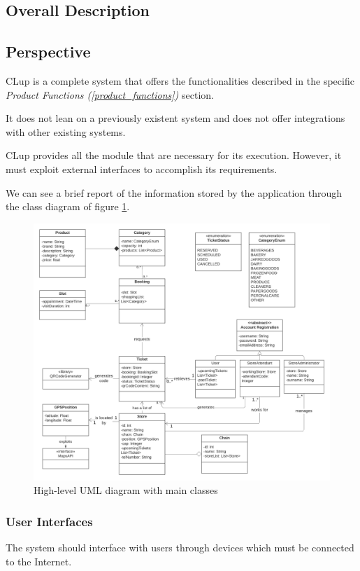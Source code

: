 \documentclass[table, 12pt]{article}
\begin{document}
\begin{flushleft}
    \section{Overall Description}
    \subsection{Perspective}
    CLup is a complete system that offers the functionalities described in the specific \textit{Product Functions (\ref{product_functions})} section.

    It does not lean on a previously existent system and does not offer integrations with other existing systems.

    CLup provides all the module that are necessary for its execution. However, it must exploit external interfaces to accomplish its requirements.

    We can see a brief report of the information stored by the application through the class diagram of figure \ref{class_diagram}.

    \begin{figure}
        \hspace{-50px}
        \includegraphics[scale=0.6]{assets/UML.png}
        \caption{High-level UML diagram with main classes}
        \label{class_diagram}

    \end{figure}

    \subsubsection{User Interfaces}
    The system should interface with users through devices which must be connected to the Internet.


\end{flushleft}
\end{document}
